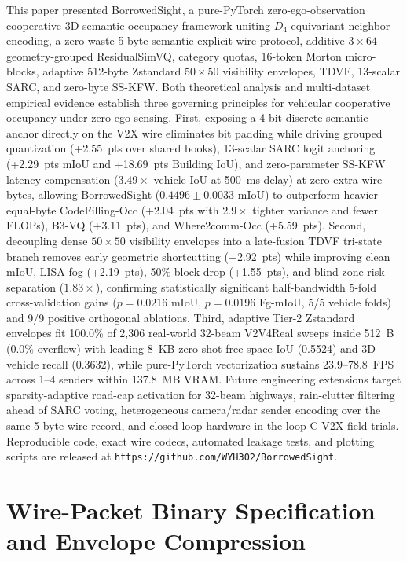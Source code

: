 \documentclass[journal]{IEEEtran}
\begin{document}
This paper presented BorrowedSight, a pure-PyTorch zero-ego-observation cooperative 3D semantic occupancy framework uniting $D_4$-equivariant neighbor encoding, a zero-waste 5-byte semantic-explicit wire protocol, additive $3\times 64$ geometry-grouped ResidualSimVQ, category quotas, 16-token Morton micro-blocks, adaptive 512-byte Zstandard $50\times 50$ visibility envelopes, TDVF, 13-scalar SARC, and zero-byte SS-KFW. Both theoretical analysis and multi-dataset empirical evidence establish three governing principles for vehicular cooperative occupancy under zero ego sensing. First, exposing a 4-bit discrete semantic anchor directly on the V2X wire eliminates bit padding while driving grouped quantization (+2.55~pts over shared books), 13-scalar SARC logit anchoring (+2.29~pts mIoU and +18.69~pts Building IoU), and zero-parameter SS-KFW latency compensation ($3.49\times$ vehicle IoU at 500~ms delay) at zero extra wire bytes, allowing BorrowedSight ($0.4496 \pm 0.0033$ mIoU) to outperform heavier equal-byte CodeFilling-Occ (+2.04~pts with $2.9\times$ tighter variance and fewer FLOPs), B3-VQ (+3.11~pts), and Where2comm-Occ (+5.59~pts). Second, decoupling dense $50\times 50$ visibility envelopes into a late-fusion TDVF tri-state branch removes early geometric shortcutting (+2.92~pts) while improving clean mIoU, LISA fog (+2.19~pts), 50\% block drop (+1.55~pts), and blind-zone risk separation ($1.83\times$), confirming statistically significant half-bandwidth 5-fold cross-validation gains ($p = 0.0216$ mIoU, $p = 0.0196$ Fg-mIoU, 5/5 vehicle folds) and 9/9 positive orthogonal ablations. Third, adaptive Tier-2 Zstandard envelopes fit 100.0\% of 2,306 real-world 32-beam V2V4Real sweeps inside 512~B (0.0\% overflow) with leading 8~KB zero-shot free-space IoU (0.5524) and 3D vehicle recall (0.3632), while pure-PyTorch vectorization sustains 23.9--78.8~FPS across 1--4 senders within 137.8~MB VRAM. Future engineering extensions target sparsity-adaptive road-cap activation for 32-beam highways, rain-clutter filtering ahead of SARC voting, heterogeneous camera/radar sender encoding over the same 5-byte wire record, and closed-loop hardware-in-the-loop C-V2X field trials. Reproducible code, exact wire codecs, automated leakage tests, and plotting scripts are released at \texttt{https://github.com/WYH302/BorrowedSight}.

\appendices

\section{Wire-Packet Binary Specification and Envelope Compression}
\label{app:wire}
\end{document}
